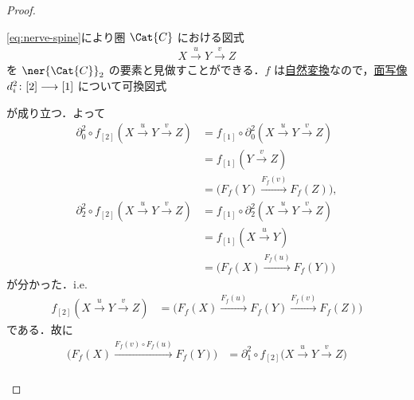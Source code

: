 \documentclass[TQFT_main]{subfiles}
\begin{document}
\begin{proof}
\begin{description}
\begin{description}
                \eqref{eq:nerve-spine}により圏 $\Cat{C}$ における図式
                \begin{align}
                    X \xrightarrow{u} Y \xrightarrow{v} Z
                \end{align}
                を $\ner{\Cat{C}}_2$ の要素と見做すことができる．$f$ は\hyperref[def:nat]{自然変換}なので，\hyperref[def:simplex-cat]{面写像} $d_i^2 \colon [2] \longrightarrow [1]$ について可換図式
                \begin{center}
                \end{center}
                が成り立つ．よって
                \begin{align}
                    \partial_0^2 \circ f_{[2]} (X \xrightarrow{u} Y \xrightarrow{v} Z)
                    &= f_{[1]} \circ \partial_0^2  (X \xrightarrow{u} Y \xrightarrow{v} Z) \\
                    &= f_{[1]} (Y \xrightarrow{v} Z) \\
                    &= \bigl(F_f(Y) \xrightarrow{F_f(v)} F_f(Z)\bigr), \\
                    \partial_2^2 \circ f_{[2]} (X \xrightarrow{u} Y \xrightarrow{v} Z)
                    &= f_{[1]} \circ \partial_2^2  (X \xrightarrow{u} Y \xrightarrow{v} Z) \\
                    &= f_{[1]} (X \xrightarrow{u} Y) \\
                    &= \bigl(F_f(X) \xrightarrow{F_f(u)} F_f(Y)\bigr)
                \end{align}
                が分かった．i.e.
                \begin{align}
                    f_{[2]} (X \xrightarrow{u} Y \xrightarrow{v} Z)
                    &=\bigl( F_f(X) \xrightarrow{F_f(u)} F_f(Y) \xrightarrow{F_f(v)} F_f(Z)\bigr)
                \end{align}
                である．故に
                \begin{align}
                    \bigl( F_f(X) \xrightarrow{F_f(v) \circ F_f(u)} F_f(Y)\bigr) 
                    &= \partial_1^2 \circ f_{[2]} \bigl( X \xrightarrow{u} Y \xrightarrow{v} Z \bigr) \\

\end{align}
\end{description}
\end{description}
\end{proof}
\end{document}
